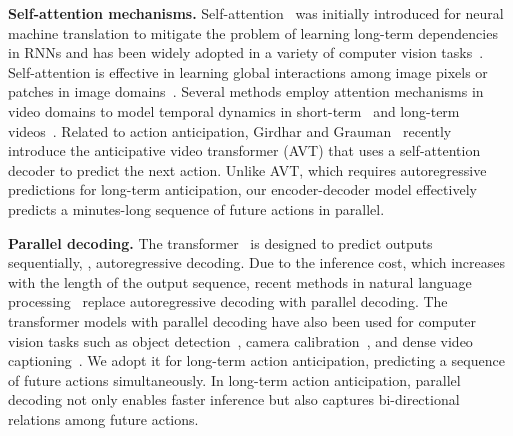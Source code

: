 \vspace{1mm}
\noindent
\textbf{Self-attention mechanisms.}
Self-attention~\cite{vaswani2017attention} was initially introduced for neural machine translation to mitigate the problem of learning long-term dependencies in RNNs and has been widely adopted in a variety of computer vision tasks~\cite{dosovitskiy2020image,kim2021relational,strudel2021segmenter,fan2021multiscale}.
Self-attention is effective in learning global interactions among image pixels or patches in image domains~\cite{Bello_2019_ICCV,dosovitskiy2020image, touvron2021training,wu2021cvt,strudel2021segmenter,liu2021swin,ramachandran2019stand,yuan2021tokens,wang2021pyramid}.
Several methods employ attention mechanisms in video domains to model temporal dynamics in short-term~\cite{kim2021relational,wang2018non,gberta_2021_ICML,arnab2021vivit,zhang2021vidtr,fan2021multiscale,patrick2021keeping} and long-term videos~\cite{nawhal2021activity,girdhar2021anticipative,zhu2020actbert,luo2020univl,li2020hero}.
Related to action anticipation, 
Girdhar and Grauman~\cite{girdhar2021anticipative} recently introduce the anticipative video transformer (AVT) that uses a self-attention decoder to predict the next action.
Unlike AVT, which requires autoregressive predictions for long-term anticipation, our encoder-decoder model effectively predicts a minutes-long sequence of future actions in parallel.

\vspace{1mm}
\noindent
\textbf{Parallel decoding.}
The transformer~\cite{vaswani2017attention} is designed to predict outputs sequentially, \ie, autoregressive decoding. Due to the inference cost, which increases with the length of the output sequence, recent methods in natural language processing~\cite{gu2018non,stern2018blockwise} replace autoregressive decoding with parallel decoding. The  transformer models with parallel decoding have also been used for computer vision tasks such as object detection~\cite{carion2020end}, camera calibration~\cite{lee2021ctrl}, and dense video captioning~\cite{wang2021end}.
We adopt it for long-term action anticipation, predicting a sequence of future actions simultaneously. In long-term action anticipation, parallel decoding not only enables faster inference but also captures bi-directional relations among future actions.

